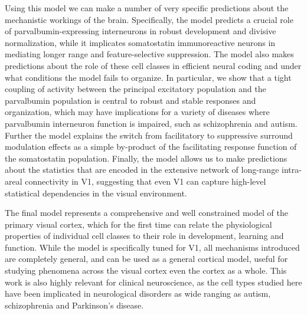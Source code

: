 Using this model we can make a number of very specific predictions
about the mechanistic workings of the brain. Specifically, the model
predicts a crucial role of parvalbumin-expressing interneurons in
robust development and divisive normalization, while it implicates
somatostatin immunoreactive neurons in mediating longer range and
feature-selective suppression. The model also makes predictions about
the role of these cell classes in efficient neural coding and under
what conditions the model fails to organize. In particular, we show
that a tight coupling of activity between the principal excitatory
population and the parvalbumin population is central to robust and
stable responses and organization, which may have implications for a
variety of diseases where parvalbumin interneuron function is
impaired, such as schizophrenia and autism. Further the model explains
the switch from facilitatory to suppressive surround modulation
effects as a simple by-product of the facilitating response function
of the somatostatin population. Finally, the model allows us to make
predictions about the statistics that are encoded in the extensive
network of long-range intra-areal connectivity in V1, suggesting that
even V1 can capture high-level statistical dependencies in the visual
environment.

The final model represents a comprehensive and well constrained model
of the primary visual cortex, which for the first time can relate the
physiological properties of individual cell classes to their role in
development, learning and function. While the model is specifically
tuned for V1, all mechanisms introduced are completely general, and
can be used as a general cortical model, useful for studying phenomena
across the visual cortex even the cortex as a whole. This work is also
highly relevant for clinical neuroscience, as the cell types studied
here have been implicated in neurological disorders as wide ranging as
autism, schizophrenia and Parkinson's disease.
\endgroup
